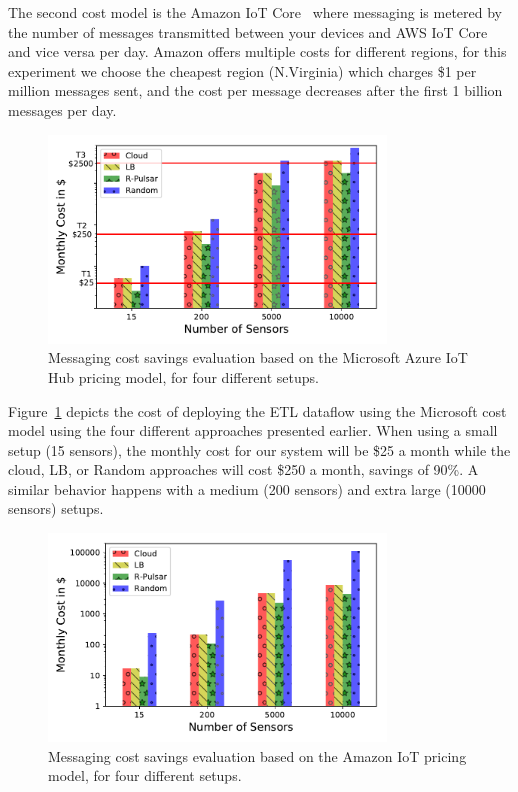 The second cost model is the Amazon IoT Core~\cite{AWSPricing} where messaging is metered by the number of messages transmitted between your devices and AWS IoT Core and vice versa per day. Amazon offers multiple costs for different regions, for this experiment we choose the cheapest region (N.Virginia) which charges \$1 per million messages sent, and the cost per message decreases after the first 1 billion messages per day.

\begin{figure}[h!]
  \centering
  \includegraphics[width=0.8\textwidth]{Results/Cost_Microsoft.pdf}
  \caption{Messaging cost savings evaluation based on the Microsoft Azure IoT Hub pricing model, for four different setups.}
  \label{fig:cost-microsoft}
\end{figure} 


Figure~\ref{fig:cost-microsoft} depicts the cost of deploying the ETL dataflow using the Microsoft cost model using the four different approaches presented earlier. When using a small setup (15 sensors), the monthly cost for our system will be \$25 a month while the cloud, LB, or Random approaches will cost \$250 a month, savings of 90\%. A similar behavior happens with a medium (200 sensors) and extra large (10000 sensors) setups. 

\begin{figure}[h!]
  \centering
  \includegraphics[width=0.8\textwidth]{Results/Cost_Amazon.pdf}
  \caption{Messaging cost savings evaluation based on the Amazon IoT pricing model, for four different setups.}
  \label{fig:cost-amazon}
\end{figure} 

